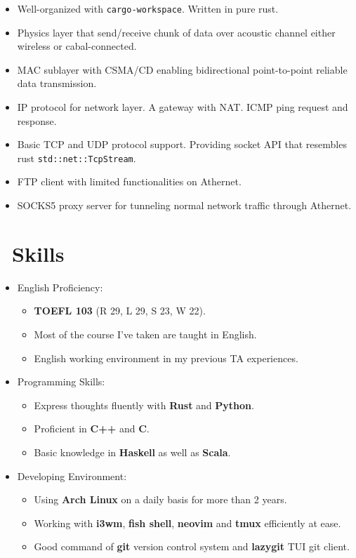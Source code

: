 \documentclass{resume}
\begin{document}
\begin{itemize}
	\item Well-organized with \texttt{cargo-workspace}. Written in pure rust.
	\item Physics layer that send/receive chunk of data over acoustic channel either wireless or cabal-connected.
	\item MAC sublayer with CSMA/CD enabling bidirectional point-to-point reliable data transmission.
	\item IP protocol for network layer. A gateway with NAT. ICMP ping request and response.
	\item Basic TCP and UDP protocol support. Providing socket API that resembles rust \texttt{std::net::TcpStream}.
	\item FTP client with limited functionalities on Athernet.
	\item SOCKS5 proxy server for tunneling normal network traffic through Athernet.
\end{itemize}

\section{\faCogs\ Skills}
\begin{itemize}[parsep=0.5ex]
	\item English Proficiency:
	      \begin{itemize}
		      \item \textbf{TOEFL 103} (R 29, L 29, S 23, W 22).
		      \item Most of the course I've taken are taught in English.
		      \item English working environment in my previous TA experiences.
	      \end{itemize}
	\item Programming Skills:
	      \begin{itemize}
			  \item Express thoughts fluently with \textbf{Rust} and \textbf{Python}.
			  \item Proficient in \textbf{C++} and \textbf{C}.
			  \item Basic knowledge in \textbf{Haskell} as well as \textbf{Scala}.
	      \end{itemize}
	\item Developing Environment:
	      \begin{itemize}
		      \item Using \textbf{Arch Linux} on a daily basis for more than 2 years.
		      \item Working with \textbf{i3wm}, \textbf{fish shell}, \textbf{neovim} and \textbf{tmux} efficiently at ease.
		      \item Good command of \textbf{git} version control system and \textbf{lazygit} TUI git client.
	      \end{itemize}
\end{itemize}
\end{document}
